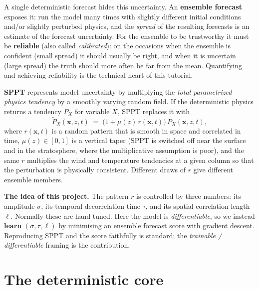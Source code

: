 \documentclass[11pt]{article}
\begin{document}
A single deterministic forecast hides this uncertainty. An \textbf{ensemble
forecast} exposes it: run the model many times with slightly different
initial conditions and/or slightly perturbed physics, and the \emph{spread} of the
resulting forecasts is an estimate of the forecast uncertainty. For the ensemble
to be trustworthy it must be \textbf{reliable} (also called
\emph{calibrated}): on the occasions when the ensemble is confident (small
spread) it should usually be right, and when it is uncertain (large spread) the
truth should more often be far from the mean. Quantifying and achieving
reliability is the technical heart of this tutorial.

\textbf{SPPT} \citep{palmer2009} represents model uncertainty by multiplying the
\emph{total parametrized physics tendency} by a smoothly varying random field.
If the deterministic physics returns a tendency $P_X$ for variable $X$, SPPT
replaces it with
\begin{equation}
  \tilde P_X(\mathbf{x},z,t) \;=\; \bigl(1 + \mu(z)\, r(\mathbf{x},t)\bigr)\, P_X(\mathbf{x},z,t),
  \label{eq:sppt}
\end{equation}
where $r(\mathbf{x},t)$ is a random pattern that is smooth in space and
correlated in time, $\mu(z)\in[0,1]$ is a vertical taper (SPPT is switched off
near the surface and in the stratosphere, where the multiplicative assumption is
poor), and the same $r$ multiplies the wind and temperature tendencies at a given
column so that the perturbation is physically consistent. Different draws of $r$
give different ensemble members.

\begin{keybox}
\textbf{The idea of this project.} The pattern $r$ is controlled by three numbers:
its amplitude $\sigma$, its temporal decorrelation time $\tau$, and its spatial
correlation length $\ell$. Normally these are hand-tuned. Here the model is
\emph{differentiable}, so we instead \textbf{learn} $(\sigma,\tau,\ell)$ by
minimising an ensemble forecast score with gradient descent. Reproducing SPPT
and the score faithfully is standard; the \emph{trainable / differentiable}
framing is the contribution.
\end{keybox}

\section{The deterministic core}
\end{document}
